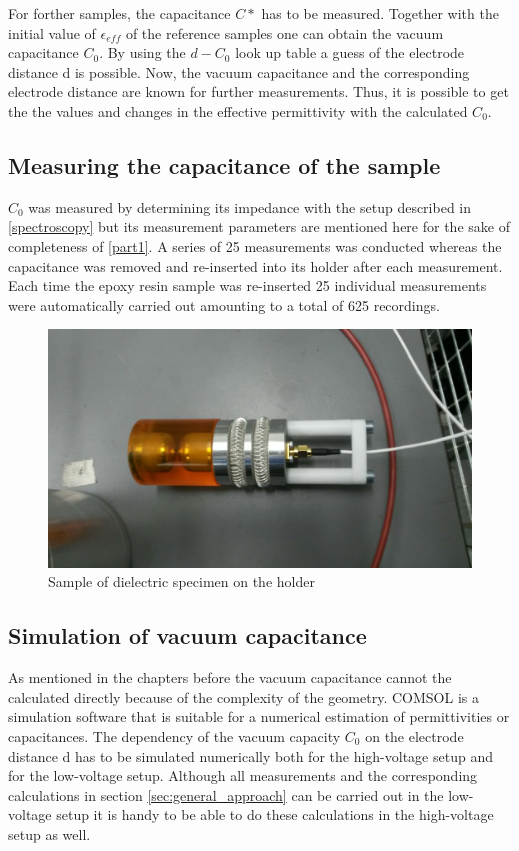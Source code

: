 For forther samples, the capacitance $C*$ has to be measured. Together with the initial value of $\epsilon_{eff}$ of the reference samples one can obtain the vacuum capacitance $C_0$. By using the $d-C_0$ look up table a guess of the electrode distance d is possible. Now, the vacuum capacitance and the corresponding electrode distance are known for further measurements. Thus, it is possible to get the the values and changes in the effective permittivity with the calculated $C_0$.


\subsection{Measuring the capacitance of the sample}

$C_0$ was measured by determining its impedance with the setup described in \ref{spectroscopy} but its measurement
parameters are mentioned here for the sake of completeness of \ref{part1}.
A series of 25 measurements was conducted whereas the capacitance was removed
and re-inserted into its holder after each measurement. Each time the epoxy resin sample was
re-inserted 25 individual measurements were automatically carried out amounting to a total of 625 recordings.

\begin{figure}[h!tb]
	\centering
	\includegraphics[width=\textwidth]{figures/Method/Experimentaufbau/epoxy.jpg}		
	\caption[Kurze Abbildungsbeschreibung]{Sample of dielectric specimen on the holder} \label{fig.comsol_beispiel}

\end{figure}


\subsection{Simulation of vacuum capacitance} 
\label{sec.sim_vac_comsol}
As mentioned in the chapters before the vacuum capacitance cannot the calculated directly because of the complexity of the geometry. COMSOL is a simulation software that is suitable for a numerical estimation of permittivities or capacitances. The dependency of the vacuum capacity $C_0$ on the electrode distance d has to be simulated numerically both for the high-voltage setup and for the low-voltage setup. Although all measurements and the corresponding calculations in section \ref{sec:general_approach} can be carried out in the low-voltage setup it is handy to be able to do these calculations in the high-voltage setup as well. 


